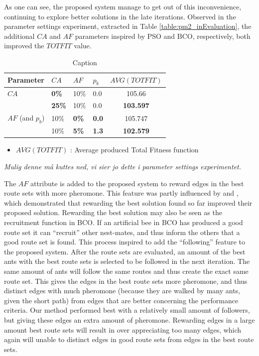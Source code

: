 As one can see, the proposed system manage to get out of this inconvenience, continuing to explore better solutions in the late iterations. Observed in the parameter settings experiment, extracted in Table \vref{table:pm2_inEvaluation}, the additional $CA$ and $AF$ parameters inspired by PSO and BCO, respectively, both improved the $TOTFIT$ value. 

\begin{table}
    \centering
    \begin{tabular}{|l|l|l|l||c|}
    \hline
    Parameter & $CA$ & $AF$ & $p_b$ & $AVG(TOTFIT)$ \\
    \hline
    $CA$ & \textbf{0\%} & 10\% & 0.0 & 105.66\\
    ~ & \textbf{25\%} & 10\% & 0.0 & \textbf{103.597}\\
    \hline
    $AF$ (and $p_b$) & 10\% & \textbf{0\%} & \textbf{0.0} & 105.747 \\
    ~ & 10\% & \textbf{5\%} & \textbf{1.3} & \textbf{102.579}\\
    \hline
    \end{tabular}
    \caption {Caption}
    \tiny
    \begin{itemize}[noitemsep]
    \item[ ] $AVG(TOTFIT)$ : Average produced Total Fitness function
    \end{itemize}
    \label{table:pm2_inEvaluation}
\end{table}
\emph{\color{blue}Mulig denne må kuttes ned, vi sier jo dette i parameter settings experimentet.}

The $AF$ attribute is added to the proposed system to reward edges in the best route sets with more pheromone. This feature was partly influenced by \citet{tripathi09} and \citet{sedighpour14}, which demonstrated that rewarding the best solution found so far improved their proposed solution. Rewarding the best solution may also be seen as the recruitment function in BCO. If an artificial bee in BCO has produced a good route set it can ``recruit'' other nest-mates, and thus inform the others that a good route set is found. This process inspired to add the ``following'' feature to the proposed system. After the route sets are evaluated, an amount of the best ants with the best route sets is selected to be followed in the next iteration. The same amount of ants will follow the same routes and thus create the exact same route set. This gives the edges in the best route sets more pheromone, and thus distinct edges with much pheromone (because they are walked by many ants, given the short path) from edges that are better concerning the performance criteria. Our method performed best with a relatively small amount of followers, but giving these edges an extra amount of pheromone.  Rewarding edges in a large amount best route sets will result in over appreciating too many edges, which again will unable to distinct edges in good route sets from edges in the best route sets. 


